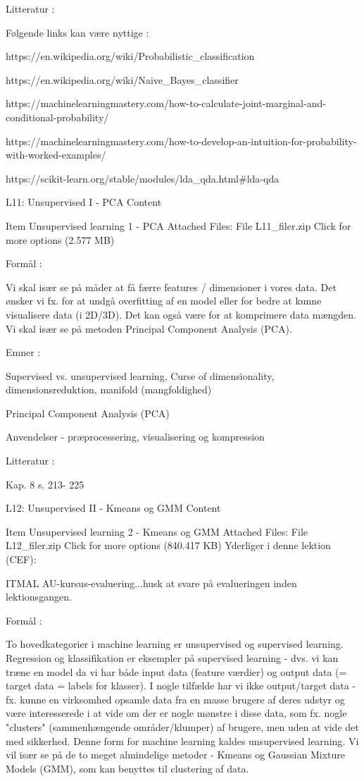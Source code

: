 {    Litteratur :

    Følgende links kan være nyttige :

    https://en.wikipedia.org/wiki/Probabilistic_classification

    https://en.wikipedia.org/wiki/Naive_Bayes_classifier

    https://machinelearningmastery.com/how-to-calculate-joint-marginal-and-conditional-probability/

    https://machinelearningmastery.com/how-to-develop-an-intuition-for-probability-with-worked-examples/

    https://scikit-learn.org/stable/modules/lda_qda.html#lda-qda 




     
     
 L11: Unsupervised I - PCA
Content

    Item
    Unsupervised learning 1 - PCA
    Attached Files:
        File L11_filer.zip Click for more options (2.577 MB) 

    Formål :

    Vi skal især se på måder at få færre features / dimensioner i vores data. Det ønsker vi fx. for at undgå overfitting af en model eller for bedre at kunne visualisere data (i 2D/3D). Det kan også være for at komprimere data mængden. Vi skal især se på metoden Principal Component Analysis (PCA).

    Emner :

    Supervised vs. unsupervised learning, Curse of dimensionality, dimensionsreduktion, manifold (mangfoldighed)

    Principal Component Analysis (PCA)

    Anvendelser - præprocessering, visualisering og kompression


    Litteratur :

    Kap. 8  s. 213- 225


 L12: Unsupervised II - Kmeans og GMM
Content

    Item
    Unsupervised learning 2 - Kmeans og GMM
    Attached Files:
        File L12_filer.zip Click for more options (840.417 KB) 
    Yderliger i denne lektion (CEF):

    ITMAL AU-kursus-evaluering...husk at svare på evalueringen inden lektionsgangen.


    Formål :

    To hovedkategorier i machine learning er unsupervised og supervised learning. Regression og klassifikation er eksempler på supervised learning - dvs. vi kan træne en model da vi har både input data (feature værdier) og output data (= target data = labels for klasser). I nogle tilfælde har vi ikke output/target data - fx.  kunne en virksomhed opsamle data fra en masse brugere af deres udstyr og være interesserede i at vide om der er nogle mønstre i disse data, som fx. nogle "clusters" (sammenhængende områder/klumper) af brugere, men uden at vide det med sikkerhed. Denne form for machine learning kaldes unsupervised learning. Vi vil især se på de to meget almindelige metoder - Kmeans og Gaussian Mixture Models (GMM), som kan benyttes til clustering af data.


}
